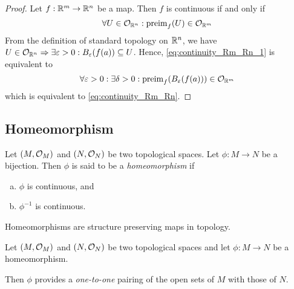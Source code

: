 \begin{proof}
	Let \(f: \mathbb R^m \to \mathbb R^n\) be a map. Then \(f\) is continuous if and only if
	\begin{equation}
		\forall U \in \mathcal{O}_{\mathbb R^n}: \operatorname{preim}_{f}(U) \in \mathcal{O}_{\mathbb R^m} \label{eq:continuity_Rm_Rn_1}
	\end{equation}
	From the definition of standard topology on \(\mathbb R^n\), we have \(U \in \mathcal{O}_{\mathbb R^n} \Rightarrow \exists \varepsilon > 0: B_{\varepsilon}(f(a)) \subseteq U\). Hence, \eqref{eq:continuity_Rm_Rn_1} is equivalent to
	\begin{equation}
		\forall \varepsilon > 0: \exists \delta > 0: \operatorname{preim}_{f}(B_{\varepsilon}(f(a))) \in \mathcal{O}_{\mathbb R^m} \label{eq:continuity_Rm_Rn_2}
	\end{equation}
	which is equivalent to \eqref{eq:continuity_Rm_Rn}.
\end{proof}

\subsection{Homeomorphism}

\begin{definition}[Homeomorphism]
	Let \((M, \mathcal{O}_M)\) and \((N, \mathcal{O}_N)\) be two topological spaces. Let \(\phi: M \to N\) be a bijection. Then \(\phi\) is said to be a \emph{homeomorphism} if
	\begin{enumerate}[(a)]
		\item \(\phi\) is continuous, and
		\item \(\phi^{-1}\) is continuous.
	\end{enumerate}
\end{definition}

\begin{remark}
	Homeomorphisms are structure preserving maps in topology.
\end{remark}

\begin{remark}
	Let \((M, \mathcal{O}_M)\) and \((N, \mathcal{O}_N)\) be two topological spaces and let \(\phi: M \to N\) be a homeomorphism.
	\begin{figure}[H]
		\centering
	\end{figure}
	Then \(\phi\) provides a \emph{one-to-one} pairing of the open sets of \(M\) with those of \(N\).
\end{remark}

